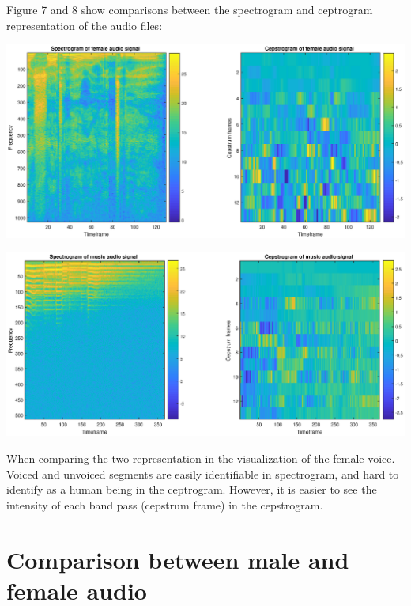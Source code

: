 \documentclass[]{article}
\let\origfigure\figure
\let\endorigfigure\endfigure
\renewenvironment{figure}[1][2] {
    \expandafter\origfigure\expandafter[H]
} {
    \endorigfigure
}
\begin{document}
Figure 7 and 8 show comparisons between the spectrogram and ceptrogram
representation of the audio files:

\begin{figure}
\centering
\includegraphics{Result_Pics/spetgram_cepgram_female.eps}
\caption{Spectrogram and ceptrogram representation of the female audio
file}
\end{figure}

\begin{figure}
\centering
\includegraphics{Result_Pics/spetgram_cepgram_music.eps}
\caption{Spectrogram and ceptrogram representation of the music audio
file}
\end{figure}

When comparing the two representation in the visualization of the female
voice. Voiced and unvoiced segments are easily identifiable in
spectrogram, and hard to identify as a human being in the ceptrogram.
However, it is easier to see the intensity of each band pass (cepstrum
frame) in the cepstrogram.

\newpage

\section{Comparison between male and female
audio}\label{comparison-between-male-and-female-audio}
\end{document}
